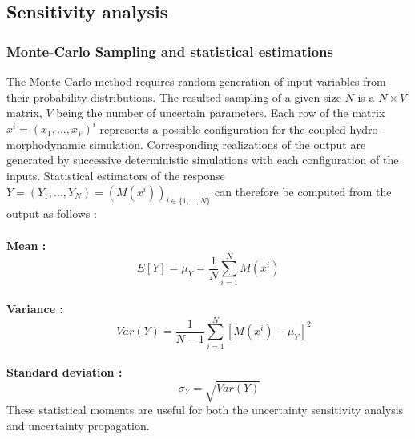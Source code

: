 \subsection{Sensitivity analysis}
\subsubsection{Monte-Carlo Sampling and statistical estimations}
\label{subsub:MC}
The Monte Carlo method requires random generation of input variables from their probability distributions. The resulted sampling of a given size $N$ is a $N \times V$ matrix, $V$ being the number of uncertain parameters.  Each row of the matrix $x^i=(x_1,...,x_V)^i$ represents a possible configuration for the coupled hydro-morphodynamic simulation. Corresponding realizations of the output are generated by successive deterministic simulations with each configuration of the inputs. Statistical estimators of the response $Y=(Y_1,...,Y_N) = (M(x^i))_{i \in \{1,...,N\}}$ can therefore be computed from the output as follows :  \\ \\
\textbf{Mean :}
\vspace{-0.7cm}
\begin{equation}
E[Y]=\mu_{Y} = \dfrac{1}{N}\sum_{i=1}^{N} M(x^{i})
\label{eq_moy}
\end{equation}
\\
\textbf{Variance :}
\vspace{-0.9cm}
\begin{equation}
 \quad Var(Y) = \dfrac{1}{N-1}\sum_{i=1}^{N} [M(x^{i})-\mu_{Y}]^{2}
\label{eq_var}
\end{equation}
\\
\textbf{Standard deviation :}
\vspace{-0.7cm}
\begin{equation}
 \qquad \sigma_Y = \sqrt{Var(Y)}
\label{eq_dev}
\end{equation}
These statistical moments are useful for both the uncertainty sensitivity analysis and uncertainty propagation.

